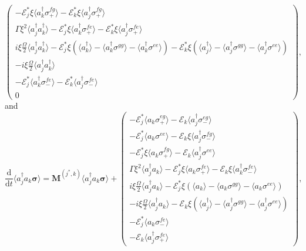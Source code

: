 \documentclass{article}
\newcommand{\ddt}{\frac{\mathrm{d}}{\mathrm{d}t}}
\begin{document}
\begin{subequations}
\begin{equation}
\begin{pmatrix}
		-\mathcal{E}_{j}^{*} \xi \langle a^{\dagger}_{k} \sigma^{fg}_{+} \rangle - \mathcal{E}_{k}^{*} \xi \langle a^{\dagger}_{j} \sigma^{fg}_{+} \rangle \\
		\Gamma \xi^{2} \langle a_{j}^{\dagger} a^{\dagger}_{k} \rangle - \mathcal{E}_{j}^{*} \xi \langle a^{\dagger}_{k} \sigma^{fe}_{+} \rangle - \mathcal{E}_{k}^{*} \xi \langle a^{\dagger}_{j} \sigma^{fe}_{+} \rangle \\
		i \xi \frac{\Omega}{2} \langle a_{j}^{\dagger} a^{\dagger}_{k} \rangle - \mathcal{E}_{j}^{*} \xi \left( \langle a^{\dagger}_{k} \rangle - \langle a^{\dagger}_{k} \sigma^{gg} \rangle - \langle a^{\dagger}_{k} \sigma^{ee} \rangle \right) - \mathcal{E}_{k}^{*} \xi \left( \langle a^{\dagger}_{j} \rangle - \langle a^{\dagger}_{j} \sigma^{gg} \rangle - \langle a^{\dagger}_{j} \sigma^{ee} \rangle \right) \\
		-i \xi \frac{\Omega}{2} \langle a_{j}^{\dagger} a^{\dagger}_{k} \rangle \\
		-\mathcal{E}_{j}^{*} \langle a^{\dagger}_{k} \sigma^{fe}_{-} \rangle - \mathcal{E}_{k}^{*} \langle a^{\dagger}_{j} \sigma^{fe}_{-} \rangle \\
		0
	\end{pmatrix},
\end{equation}
\end{subequations}
and
\begin{equation}
	\ddt \langle a^{\dagger}_{j} a_{k} \bm{\sigma} \rangle = \bm{M}^{(j^{*}, k)} \langle a^{\dagger}_{j} a_{k} \bm{\sigma} \rangle + 
	\begin{pmatrix}
		-\mathcal{E}_{j}^{*} \langle a_{k} \sigma^{eg}_{+} \rangle - \mathcal{E}_{k} \langle a^{\dagger}_{j} \sigma^{eg}_{-} \rangle \\
		-\mathcal{E}_{j}^{*} \langle a_{k} \sigma^{ee} \rangle - \mathcal{E}_{k} \xi \langle a^{\dagger}_{j} \sigma^{fg}_{-} \rangle \\
		-\mathcal{E}_{j}^{*} \xi \langle a_{k} \sigma^{fg}_{+} \rangle - \mathcal{E}_{k} \langle a^{\dagger}_{j} \sigma^{ee} \rangle \\
		\Gamma \xi^{2} \langle a^{\dagger}_{j} a_{k} \rangle - \mathcal{E}_{j}^{*} \xi \langle a_{k} \sigma^{fe}_{+} \rangle - \mathcal{E}_{k} \xi \langle a^{\dagger}_{k} \sigma^{fe}_{-} \rangle \\
		i \xi \frac{\Omega}{2} \langle a^{\dagger}_{j} a_{k} \rangle - \mathcal{E}_{j}^{*} \xi \left( \langle a_{k} \rangle - \langle a_{k} \sigma^{gg} \rangle - \langle a_{k} \sigma^{ee} \rangle \right) \\
		-i \xi \frac{\Omega}{2} \langle a^{\dagger}_{j} a_{k} \rangle - \mathcal{E}_{k} \xi \left( \langle a^{\dagger}_{j} \rangle - \langle a^{\dagger}_{j} \sigma^{gg} \rangle - \langle a^{\dagger}_{j} \sigma^{ee} \rangle \right) \\
		-\mathcal{E}_{j}^{*} \langle a_{k} \sigma^{fe}_{-} \rangle \\
		-\mathcal{E}_{k} \langle a^{\dagger}_{j} \sigma^{fe}_{+} \rangle
	\end{pmatrix},
\end{equation}
\end{document}
